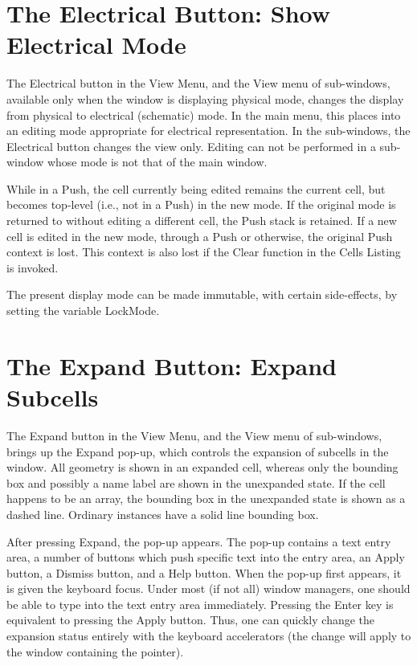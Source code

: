 \section{The {\cb Electrical} Button: Show Electrical Mode}
The {\cb Electrical} button in the {\cb View Menu}, and the {\cb View}
menu of sub-windows, available only when the window is displaying
physical mode, changes the display from physical to electrical
(schematic) mode.  In the main menu, this places {\Xic} into an
editing mode appropriate for electrical representation.  In the
sub-windows, the {\cb Electrical} button changes the view only. 
Editing can not be performed in a sub-window whose mode is not that of
the main window.

While in a {\cb Push}, the cell currently being edited
remains the current cell, but becomes top-level (i.e., not in a {\cb Push})
in the new mode.  If the original mode is returned to without editing
a different cell, the {\cb Push} stack is retained.  If a new cell is
edited in the new mode, through a {\cb Push} or otherwise, the
original {\cb Push} context is lost.  This context is also lost if the
{\cb Clear} function in the {\cb Cells Listing} is invoked.

The present display mode can be made immutable, with certain
side-effects, by setting the variable {\et LockMode}.


\section{The {\cb Expand} Button: Expand Subcells}
\label{expansion}
The {\cb Expand} button in the {\cb View Menu}, and the {\cb View}
menu of sub-windows, brings up the {\cb Expand} pop-up, which controls
the expansion of subcells in the window.  All geometry is shown in an
expanded cell, whereas only the bounding box and possibly a name label
are shown in the unexpanded state.  If the cell happens to be an
array, the bounding box in the unexpanded state is shown as a dashed
line.  Ordinary instances have a solid line bounding box.

After pressing {\cb Expand}, the pop-up appears.  The pop-up contains
a text entry area, a number of buttons which push specific text into
the entry area, an {\cb Apply} button, a {\cb Dismiss} button, and a
{\cb Help} button.  When the pop-up first appears, it is given the
keyboard focus.  Under most (if not all) window managers, one should
be able to type into the text entry area immediately.  Pressing the
{\kb Enter} key is equivalent to pressing the {\cb Apply} button. 
Thus, one can quickly change the expansion status entirely with the
keyboard accelerators (the change will apply to the window containing
the pointer).

